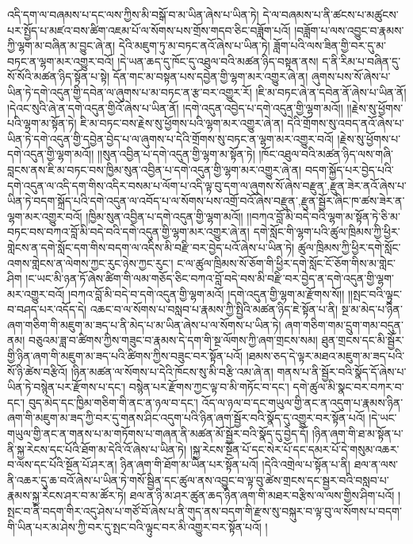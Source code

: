འདི་དག་ལ་བཞམས་པ་དང་ལས་ཀྱིས་མི་བསྒོ་བ་མ་ཡིན་ཞེས་པ་ཡིན་ཏེ། དེ་ལ་བཞམས་པ་ནི་ཚངས་པ་མཚུངས་པར་སྤྱོད་པ་མཛའ་བས་ཚིག་འཇམ་པོ་ལ་སོགས་པས་གྲོས་གདབ་ཅིང་བཟློག་པའོ། །བཟློག་པ་ལས་འབྱུང་བ་རྣམས་ཀྱི་ལྷག་མ་བཞིན་མ་བྱུང་ཞེ་ན། དེའི་མཇུག་ཏུ་མ་བཏང་ནའོ་ཞེས་པ་ཡིན་ཏེ། ཟློག་པའི་ལས་ཟིན་གྱི་བར་དུ་མ་བཏང་ན་ལྷག་མར་འགྱུར་བའོ། །དེ་ཡན་ཆད་དུ་ཁོང་དུ་འཐུལ་བའི་མཚན་ཉིད་བསྟན་ནས། ད་ནི་རིམ་པ་བཞིན་དུ་སོ་སོའི་མཚན་ཉིད་སྟོན་པ་སྟེ། དོན་གང་མ་བསྟན་པས་དབྱེན་གྱི་ལྷག་མར་འགྱུར་ཞེ་ན། ཞུགས་པས་སོ་ཞེས་པ་ཡིན་ཏེ་དགེ་འདུན་གྱི་དབེན་ལ་ཞུགས་པ་མ་བཏང་ན་རྩ་བར་འགྱུར་རོ། །ཇི་མ་བཏང་ཞེ་ན་དབེན་ནོ་ཞེས་པ་ཡིན་ནོ། །དེའང་སུའི་ཞེ་ན་དགེ་འདུན་གྱིའོ་ཞེས་པ་ཡིན་ནོ། །དགེ་འདུན་འབྱེད་པ་དགེ་འདུན་གྱི་ལྷག་མའོ།། །།རྗེས་སུ་ཕྱོགས་པའི་ལྷག་མ་སྟོན་ཏེ། ཇི་མ་བཏང་བས་རྗེས་སུ་ཕྱོགས་པའི་ལྷག་མར་འགྱུར་ཞེ་ན། དེའི་གྲོགས་སུ་འབད་ནའོ་ཞེས་པ་ཡིན་ཏེ་དགེ་འདུན་གྱི་དབྱེན་བྱེད་པ་ལ་ཞུགས་པ་དེའི་གྲོགས་སུ་བཏང་ན་ལྷག་མར་འགྱུར་བའོ། །རྗེས་སུ་ཕྱོགས་པ་དགེ་འདུན་གྱི་ལྷག་མའོ།། །།སུན་འབྱིན་པ་དགེ་འདུན་གྱི་ལྷག་མ་སྟོན་ཏེ། །ཁོང་འཐུལ་བའི་མཚན་ཉིད་ལས་གཞི་བླངས་ནས་ཇི་མ་བཏང་བས་ཁྱིམ་སུན་འབྱིན་པ་དགེ་འདུན་གྱི་ལྷག་མར་འགྱུར་ཞེ་ན། བདག་སྐྱོད་པར་བྱེད་པའི་དགེ་འདུན་ལ་འདི་དག་གིས་འདིར་བསམ་པ་ལོག་པ་འདི་ལྟ་བུ་དག་ལ་ཞུགས་སོ་ཞེས་{བརྫུན་,རྫུན་}ཟེར་ནའོ་ཞེས་པ་ཡིན་ཏེ་བདག་སྐྲོད་པའི་དགེ་འདུན་ལ་འབོད་པ་ལ་སོགས་པས་འགྲོ་བའོ་ཞེས་{བརྫུན་,རྫུན་}སྦྱོར་ཞིང་ཁ་ཚས་ཟེར་ན་ལྷག་མར་འགྱུར་བའོ། །ཁྱིམ་སུན་འབྱིན་པ་དགེ་འདུན་གྱི་ལྷག་མའོ།། །།བཀའ་བློ་མི་བདེ་བའི་ལྷག་མ་སྟོན་ཏེ་ཅི་མ་བཏང་བས་བཀའ་བློ་མི་བདེ་བའི་དགེ་འདུན་གྱི་ལྷག་མར་འགྱུར་ཞེ་ན། དགེ་སློང་གི་ལྷག་པའི་ཚུལ་ཁྲིམས་ཀྱི་ཕྱིར་གླེངས་ན་དགེ་སློང་དག་གིས་བདག་ལ་འདིས་མི་བརྫི་བར་བྱེད་པའོ་ཞེས་པ་ཡིན་ཏེ། ཚུལ་ཁྲིམས་ཀྱི་ཕྱིར་དགེ་སློང་འགས་གླེངས་ན་ལེགས་ཀྱང་རུང་ཉེས་ཀྱང་རུང་། ང་ལ་ཚུལ་ཁྲིམས་སོ་ཅོག་གི་ཕྱིར་དགེ་སློང་ངོ་ཅོག་གིས་མ་གླེང་ཤིག །ང་ཡང་མི་ཉན་ཏོ་ཞེས་ཚིག་གི་ལམ་གཅོད་ཅིང་བཀའ་བློ་བདེ་བས་མི་བརྫི་བར་བྱེད་ན་དགེ་འདུན་གྱི་ལྷག་མར་འགྱུར་བའོ། །བཀའ་བློ་མི་བདེ་བ་དགེ་འདུན་གྱི་ལྷག་མའོ། །དགེ་འདུན་གྱི་ལྷག་མ་རྫོགས་སོ།། །།སྤང་བའི་ལྟུང་བ་བཤད་པར་འདོད་དེ། འཆང་བ་ལ་སོགས་པ་བསླབ་པ་རྣམས་ཀྱི་སྤྱིའི་མཚན་ཉིད་ཇེ་སྟོན་པ་ནི། སྔ་མ་མེད་པ་ཉིན་ཞག་གཅིག་གི་མཇུག་མ་ཟད་པ་ནི་མེད་པ་མ་ཡིན་ཞེས་པ་ལ་སོགས་པ་ཡིན་ཏེ། ཞག་གཅིག་གམ་དྲུག་གམ་བདུན་ནམ། བཅུའམ་ཟླ་བ་ཚིགས་ཀྱིས་གཟུང་བ་རྣམས་དེ་དག་གི་སྔ་ལོགས་ཀྱི་ཞག་གྲངས་སམ། ཐུན་གྲངས་དང་མི་སྦྱོར་གྱི་ཉིན་ཞག་གི་མཇུག་མ་ཟད་པའི་ཚིགས་ཀྱིས་བཟུང་བར་སྟོན་པའོ། །ཐམས་ཅད་དེ་ལྟར་མཐའ་མཇུག་མ་ཟད་པའི་སོ་ཉི་ཚེས་བརྩིའོ། །ཉིན་མཚན་ལ་སོགས་པ་དེའི་ཁོངས་སུ་མི་བརྩི་འམ་ཞེ་ན། གནས་པ་ནི་སྦྱོར་བའི་སྣོད་དོ་ཞེས་པ་ཡིན་ཏེ་བསྙེན་པར་རྫོགས་པ་དང་། བསྙེན་པར་རྫོགས་ཀྱང་ལྟ་བ་མི་གཏོང་བ་དང་། དགེ་ཚུལ་མི་སྣང་བར་བཀར་བ་དང་། བུད་མེད་དང་ཁྱིམ་གཅིག་གི་ནང་ན་ཉལ་བ་དང་། འོད་ལ་ཉལ་བ་དང་གཡུལ་གྱི་ནང་ན་འདུག་པ་རྣམས་ཉིན་ཞག་གི་མཇུག་མ་ཟད་ཀྱི་བར་དུ་གནས་ཤིང་འདུག་པའི་ཉིན་ཞག་སྦྱོར་བའི་སྣོད་དུ་འགྱུར་བར་སྟོན་པའོ། །དེ་ཡང་གཡུལ་གྱི་ནང་ན་གནས་པ་མ་གཏོགས་པ་གཞན་ནི་མཚན་མོ་སྦྱོར་བའི་སྣོད་དུ་བྱེད་དོ། །ཉིན་ཞག་གི་ཐ་མ་སྟོན་པ་ནི་སྐྱ་རེངས་དང་པོའི་ཐོག་མ་དེའི་འོ་ཞེས་པ་ཡིན་ཏེ། །སྐྱ་རེངས་སྔོན་པོ་དང་སེར་པོ་དང་དམར་པོ་དེ་གསུམ་འཆར་བ་ལས་དང་པོའི་སྔོན་པོ་ཤར་ན། ཉིན་ཞག་གི་ཐོག་མ་ཡིན་པར་སྟོན་པའོ། །དེའི་འགྲེལ་པ་སྟོན་པ་ནི། ཐལ་ན་ལས་ནི་འཆར་དུ་ཆ་བའོ་ཞེས་པ་ཡིན་ཏེ་གསོ་སྦྱིན་དང་ཚུལ་ནས་འབྱུང་བ་ལྟ་བུ་ཚེས་གྲངས་དང་སྦྱར་བའི་བསླབ་པ་རྣམས་སྐྱ་རེངས་ཤར་བ་མ་ཚོར་ཏེ། ཐལ་ན་ཉི་མ་ཤར་ཚུན་ཆད་ཉིན་ཞག་གི་མཐར་བརྩིས་ལ་ལས་གྱིས་ཤིག་པའོ། །སྤང་བ་ནི་བདག་གིར་འདུ་ཤེས་པ་གཙོ་བོ་ཞེས་པ་ནི་གུད་ནས་བདག་གི་རྫས་སུ་བསྐུར་བ་ལྟ་བུ་ལ་སོགས་པ་བདག་གི་ཡིན་པར་མ་ཤེས་ཀྱི་བར་དུ་སྤང་བའི་ལྟུང་བར་མི་འགྱུར་བར་སྟོན་པའོ། །
